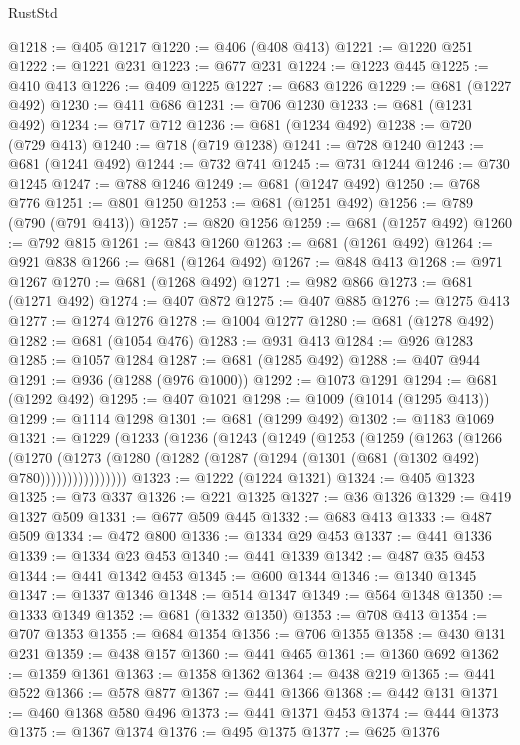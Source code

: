 \begin{lexlean}{RustStd}
\begin{coremodule}
@1218 := @405 @1217
@1220 := @406 (@408 @413)
@1221 := @1220 @251
@1222 := @1221 @231
@1223 := @677 @231
@1224 := @1223 @445
@1225 := @410 @413
@1226 := @409 @1225
@1227 := @683 @1226
@1229 := @681 (@1227 @492)
@1230 := @411 @686
@1231 := @706 @1230
@1233 := @681 (@1231 @492)
@1234 := @717 @712
@1236 := @681 (@1234 @492)
@1238 := @720 (@729 @413)
@1240 := @718 (@719 @1238)
@1241 := @728 @1240
@1243 := @681 (@1241 @492)
@1244 := @732 @741
@1245 := @731 @1244
@1246 := @730 @1245
@1247 := @788 @1246
@1249 := @681 (@1247 @492)
@1250 := @768 @776
@1251 := @801 @1250
@1253 := @681 (@1251 @492)
@1256 := @789 (@790 (@791 @413))
@1257 := @820 @1256
@1259 := @681 (@1257 @492)
@1260 := @792 @815
@1261 := @843 @1260
@1263 := @681 (@1261 @492)
@1264 := @921 @838
@1266 := @681 (@1264 @492)
@1267 := @848 @413
@1268 := @971 @1267
@1270 := @681 (@1268 @492)
@1271 := @982 @866
@1273 := @681 (@1271 @492)
@1274 := @407 @872
@1275 := @407 @885
@1276 := @1275 @413
@1277 := @1274 @1276
@1278 := @1004 @1277
@1280 := @681 (@1278 @492)
@1282 := @681 (@1054 @476)
@1283 := @931 @413
@1284 := @926 @1283
@1285 := @1057 @1284
@1287 := @681 (@1285 @492)
@1288 := @407 @944
@1291 := @936 (@1288 (@976 @1000))
@1292 := @1073 @1291
@1294 := @681 (@1292 @492)
@1295 := @407 @1021
@1298 := @1009 (@1014 (@1295 @413))
@1299 := @1114 @1298
@1301 := @681 (@1299 @492)
@1302 := @1183 @1069
@1321 := @1229
    (@1233
      (@1236
        (@1243
          (@1249
            (@1253
              (@1259
                (@1263
                  (@1266
                    (@1270
                      (@1273
                        (@1280 (@1282 (@1287 (@1294 (@1301 (@681 (@1302 @492) @780))))))))))))))))
@1323 := @1222 (@1224 @1321)
@1324 := @405 @1323
@1325 := @73 @337
@1326 := @221 @1325
@1327 := @36 @1326
@1329 := @419 @1327 @509
@1331 := @677 @509 @445
@1332 := @683 @413
@1333 := @487 @509
@1334 := @472 @800
@1336 := @1334 @29 @453
@1337 := @441 @1336
@1339 := @1334 @23 @453
@1340 := @441 @1339
@1342 := @487 @35 @453
@1344 := @441 @1342 @453
@1345 := @600 @1344
@1346 := @1340 @1345
@1347 := @1337 @1346
@1348 := @514 @1347
@1349 := @564 @1348
@1350 := @1333 @1349
@1352 := @681 (@1332 @1350)
@1353 := @708 @413
@1354 := @707 @1353
@1355 := @684 @1354
@1356 := @706 @1355
@1358 := @430 @131 @231
@1359 := @438 @157
@1360 := @441 @465
@1361 := @1360 @692
@1362 := @1359 @1361
@1363 := @1358 @1362
@1364 := @438 @219
@1365 := @441 @522
@1366 := @578 @877
@1367 := @441 @1366
@1368 := @442 @131
@1371 := @460 @1368 @580 @496
@1373 := @441 @1371 @453
@1374 := @444 @1373
@1375 := @1367 @1374
@1376 := @495 @1375
@1377 := @625 @1376

\end{coremodule}
\end{lexlean}
